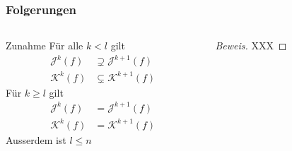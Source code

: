 %
%
%
\begin{frame}[t]
\frametitle{Folgerungen}
\begin{columns}[t]
\begin{column}{0.48\textwidth}
\begin{block}{Zunahme}
Für alle $k<l$ gilt
\begin{align*}
\mathcal{J}^k(f) &\supsetneq \mathcal{J}^{k+1}(f)
\\
\mathcal{K}^k(f) &\subsetneq \mathcal{K}^{k+1}(f)
\end{align*}
Für $k\ge l$ gilt
\begin{align*}
\mathcal{J}^k(f) &= \mathcal{J}^{k+1}(f)
\\
\mathcal{K}^k(f) &= \mathcal{K}^{k+1}(f)
\end{align*}
Ausserdem ist $l\le n$
\end{block}
\end{column}
\begin{column}{0.48\textwidth}
\begin{proof}[Beweis]
XXX
\end{proof}
\end{column}
\end{columns}
\end{frame}
